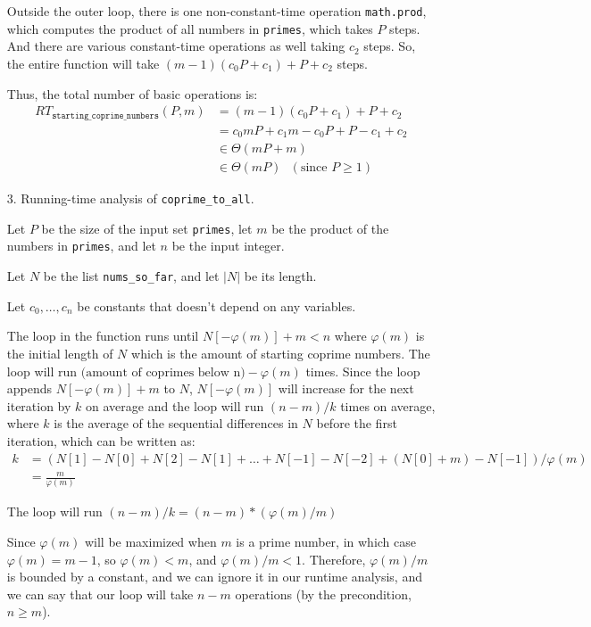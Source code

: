 \documentclass[fontsize=11pt]{article}
\newcommand{\code}[1]{\texttt{#1}}
\begin{document}
\begin{enumerate}
Outside the outer loop, there is one non-constant-time operation \code{math.prod}, which computes the product of all numbers in \code{primes}, which takes $P$ steps. And there are various constant-time operations as well taking $c_2$ steps. So, the entire function will take $(m - 1)(c_0P + c_1) + P + c_2$ steps.

Thus, the total number of basic operations is:
\begin{align}
RT_{\code{starting\_coprime\_numbers}}(P, m) &= (m - 1)(c_0P + c_1) + P + c_2 \\
& = c_0mP + c_1m - c_0P + P - c_1 + c_2 \\
& \in \Theta(mP + m) \\
& \in \Theta(mP) ~~~ (\text{since } P \ge 1)
\end{align}

\item[3.]
Running-time analysis of \texttt{coprime\_to\_all}.

Let $P$ be the size of the input set \code{primes}, let $m$ be the product of the numbers in \code{primes}, and let $n$ be the input integer.

Let $N$ be the list \code{nums\_so\_far}, and let $|N|$ be its length.

Let $c_0, \dots, c_n$ be constants that doesn't depend on any variables.

The loop in the function runs until $N[-\varphi(m)] + m < n$ where $\varphi(m)$ is the initial length of $N$ which is the amount of starting coprime numbers. The loop will run $\text{(amount of coprimes below n)} - \varphi(m)$ times. Since the loop appends $N[-\varphi(m)] + m$ to $N$, $N[-\varphi(m)]$ will increase for the next iteration by $k$ on average and the loop will run $(n - m) / k$ times on average, where $k$ is the average of the sequential differences in $N$ before the first iteration, which can be written as:
\begin{align}
    k &= (N[1] - N[0] + N[2] - N[1] + \dots + N[-1] - N[-2] + (N[0] + m) - N[-1]) / \varphi(m)\\
    &= \frac{m}{\varphi(m)}
\end{align}

The loop will run $(n - m) / k  = (n - m) * (\varphi(m) / m)$

Since $\varphi(m)$ will be maximized when $m$ is a prime number, in which case $\varphi(m) = m - 1$, so $\varphi(m) < m$, and $\varphi(m) / m < 1$. Therefore, $\varphi(m) / m$ is bounded by a constant, and we can ignore it in our runtime analysis, and we can say that our loop will take $n - m$ operations (by the precondition, $n \ge m$).


\end{enumerate}
\end{document}
